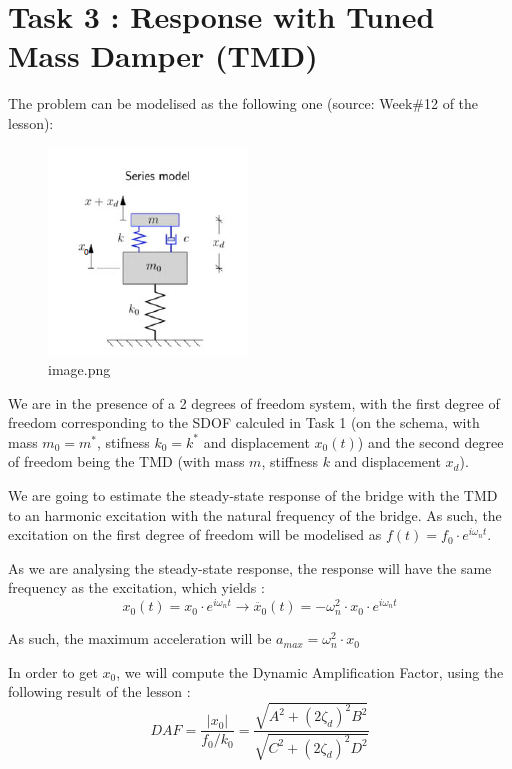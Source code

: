 \documentclass[11pt]{article}
\begin{document}
    \hypertarget{task-3-response-with-tuned-mass-damper-tmd}{%
\section{Task 3 : Response with Tuned Mass Damper
(TMD)}\label{task-3-response-with-tuned-mass-damper-tmd}}

    The problem can be modelised as the following one (source: Week\#12 of
the lesson):

\begin{figure}
\centering
\includegraphics{Assignment4_JulienArs_files/image.png}
\caption{image.png}
\end{figure}

We are in the presence of a 2 degrees of freedom system, with the first
degree of freedom corresponding to the SDOF calculed in Task 1 (on the
schema, with mass \(m_0 = m^*\), stifness \(k_0 = k^*\) and displacement
\(x_0 (t)\)) and the second degree of freedom being the TMD (with mass
\(m\), stiffness \(k\) and displacement \(x_d\)).

We are going to estimate the steady-state response of the bridge with
the TMD to an harmonic excitation with the natural frequency of the
bridge. As such, the excitation on the first degree of freedom will be
modelised as \(f(t) = f_0 \cdot e^{i\omega_n t}\).

    As we are analysing the steady-state response, the response will have
the same frequency as the excitation, which yields :
\[ x_0(t) = x_0  \cdot e^{i\omega_n t} \rightarrow \ddot{x_0}(t) = - \omega_n^2 \cdot x_0 \cdot e^{i\omega_n t} \]

As such, the maximum acceleration will be
\(a_{max} = \omega_n^2 \cdot x_0\)

    In order to get \(x_0\), we will compute the Dynamic Amplification
Factor, using the following result of the lesson : \[
DAF = \frac{\left|x_0\right|}{f_0 / k_0}=\frac{\sqrt{A^2+\left(2 \zeta_d\right)^2 B^2}}{\sqrt{C^2+\left(2 \zeta_d\right)^2 D^2}}
\]
\end{document}
